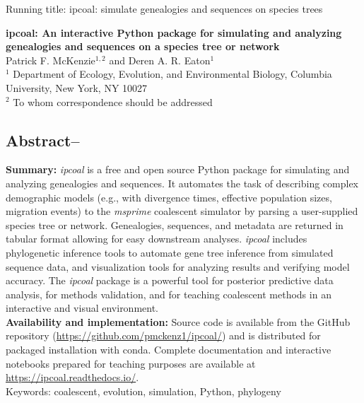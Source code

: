 \documentclass[11pt]{article}
\begin{document}
\noindent Running title: ipcoal: simulate genealogies and sequences on species trees\\

\begin{center}
{\bf \Large 
ipcoal: An interactive Python package for simulating and analyzing genealogies and sequences on a species tree or network
}\\[0.25cm]

Patrick F. McKenzie$^{1, 2}$ and Deren A. R. Eaton$^{1}$\\[0.25cm]

$^{1}$ Department of Ecology, Evolution, and Environmental Biology, Columbia University, New York, NY 10027 \\
$^{2}$ To whom correspondence should be addressed

\end{center}
\noindent

\subsection*{Abstract--}
\textbf{Summary:} \emph{ipcoal} is a free and open source Python package for simulating and analyzing genealogies and sequences. It automates the task of describing complex demographic models (e.g., with divergence times, effective population sizes, migration events) to the \emph{msprime} coalescent simulator by parsing a user-supplied species tree or network. Genealogies, sequences, and metadata are returned in tabular format allowing for easy downstream analyses. \emph{ipcoal} includes phylogenetic inference tools to automate gene tree inference from simulated sequence data, and visualization tools for analyzing results and verifying model accuracy. The \emph{ipcoal} package is a powerful tool for posterior predictive data analysis, for methods validation, and for teaching coalescent methods in an interactive and visual environment. \\

\noindent \textbf{Availability and implementation:} Source code is available from the GitHub repository (\url{https://github.com/pmckenz1/ipcoal/}) and is distributed for packaged installation with conda. Complete documentation and interactive notebooks prepared for teaching purposes are available at \url{https://ipcoal.readthedocs.io/}.\\

\noindent Keywords: coalescent, evolution, simulation, Python, phylogeny

\RaggedRight
\bigskip
\end{document}
